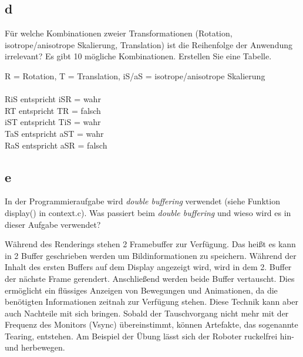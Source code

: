 \documentclass[12pt]{scrreprt}
\begin{document}
\subsection*{d}

Für welche Kombinationen zweier Transformationen (Rotation, isotrope/anisotrope Skalierung,
Translation) ist die Reihenfolge der Anwendung irrelevant? Es gibt 10 mögliche Kombinationen. Erstellen
Sie eine Tabelle.

R = Rotation, T = Translation,  iS/aS = isotrope/anisotrope Skalierung\\
\\
RiS entspricht iSR = wahr\\
RT entspricht TR   = falsch\\
iST entspricht TiS = wahr\\
TaS entspricht aST = wahr\\
RaS entspricht aSR = falsch\\

\subsection*{e}

In der Programmieraufgabe wird \emph{double buffering} verwendet (siehe Funktion display() in
context.c). Was passiert beim \emph{double buffering} und wieso wird es in dieser Aufgabe verwendet?

Während des Renderings stehen 2 Framebuffer zur Verfügung. Das heißt es kann in 2 Buffer geschrieben werden um Bildinformationen zu speichern. Während der Inhalt des ersten Buffers auf dem Display angezeigt wird, wird in dem 2. Buffer der nächste Frame gerendert. Anschließend werden beide Buffer vertauscht. Dies ermöglicht ein flüssiges Anzeigen von Bewegungen und Animationen, da die benötigten Informationen zeitnah zur Verfügung stehen. Diese Technik kann aber auch Nachteile mit sich bringen. Sobald der Tauschvorgang nicht mehr mit der Frequenz des Monitors (Vsync) übereinstimmt, können Artefakte, das sogenannte Tearing, entstehen. Am Beispiel der Übung lässt sich der Roboter ruckelfrei hin- und herbewegen.
\end{document}
